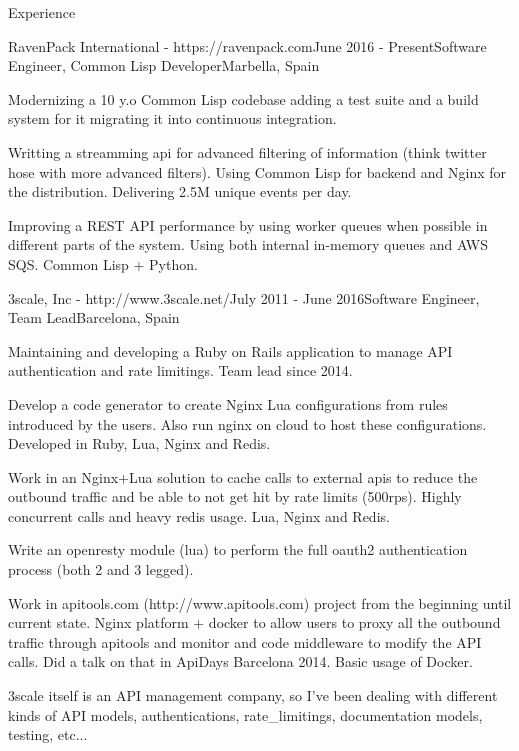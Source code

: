 \documentclass{resume} %
\begin{document}
\begin{rSection}{Experience}
\begin{rSubsection}{RavenPack International - https://ravenpack.com}{June 2016  - Present}{Software Engineer, Common Lisp Developer}{Marbella, Spain}
\item Modernizing a 10 y.o Common Lisp codebase adding a test suite
  and a build system for it migrating it into continuous
  integration.
\item Writting a streamming api for advanced filtering of information
  (think twitter hose with more advanced filters). Using Common Lisp
  for backend and Nginx for the distribution.  Delivering 2.5M unique
  events per day.
\item Improving a REST API performance by using worker queues when
  possible in different parts of the system. Using both internal
  in-memory queues and AWS SQS. Common Lisp + Python.

\end{rSubsection}

\begin{rSubsection}{3scale, Inc - http://www.3scale.net/}{July 2011 - June 2016}{Software Engineer, Team Lead}{Barcelona, Spain}
\item Maintaining and developing a Ruby on Rails application to manage
  API authentication and rate limitings. Team lead since 2014.
\item Develop a code generator to create Nginx Lua configurations from
  rules introduced by the users. Also run nginx on cloud to host these
  configurations. Developed in Ruby, Lua, Nginx and Redis.
\item Work in an Nginx+Lua solution to cache calls to external apis to
  reduce the outbound traffic and be able to not get hit by rate
  limits (500rps). Highly concurrent calls and heavy redis usage. Lua,
  Nginx and Redis.
\item Write an openresty module (lua) to perform the full oauth2
  authentication process (both 2 and 3 legged).
\item Work in apitools.com (http://www.apitools.com) project from the
  beginning until current state. Nginx platform + docker to allow
  users to proxy all the outbound traffic through apitools and monitor
  and code middleware to modify the API calls. Did a talk on that in
  ApiDays Barcelona 2014. Basic usage of Docker.
\item 3scale itself is an API management company, so I've been dealing
  with different kinds of API models, authentications,
  rate\_limitings, documentation models, testing, etc...
\end{rSubsection}


\end{rSection}
\end{document}
